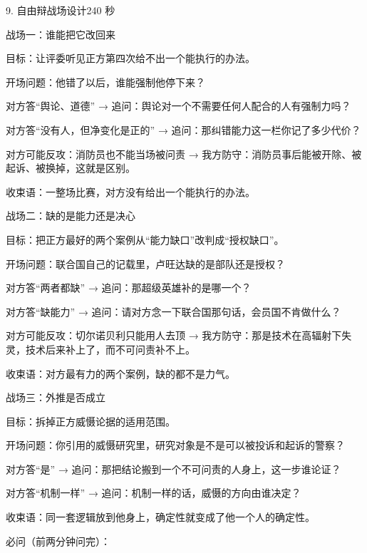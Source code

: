 \documentclass[script,con]{debate}
\begin{document}
\begin{stage}{9. 自由辩战场设计}{240 秒}
\begin{battleground}{战场一：谁能把它改回来}
\begin{bullets}
\item 目标：让评委听见正方第四次给不出一个能执行的办法。
\item 开场问题：他错了以后，谁能强制他停下来？
\item 对方答“舆论、道德” → 追问：舆论对一个不需要任何人配合的人有强制力吗？
\item 对方答“没有人，但净变化是正的” → 追问：那纠错能力这一栏你记了多少代价？
\item 对方可能反攻：消防员也不能当场被问责 → 我方防守：消防员事后能被开除、被起诉、被换掉，这就是区别。
\item 收束语：一整场比赛，对方没有给出一个能执行的办法。
\end{bullets}
\end{battleground}
\begin{battleground}{战场二：缺的是能力还是决心}
\begin{bullets}
\item 目标：把正方最好的两个案例从“能力缺口”改判成“授权缺口”。
\item 开场问题：联合国自己的记载里，卢旺达缺的是部队还是授权？
\item 对方答“两者都缺” → 追问：那超级英雄补的是哪一个？
\item 对方答“缺能力” → 追问：请对方念一下联合国那句话，会员国不肯做什么？
\item 对方可能反攻：切尔诺贝利只能用人去顶 → 我方防守：那是技术在高辐射下失灵，技术后来补上了，而不可问责补不上。
\item 收束语：对方最有力的两个案例，缺的都不是力气。
\end{bullets}
\end{battleground}
\begin{battleground}{战场三：外推是否成立}
\begin{bullets}
\item 目标：拆掉正方威慑论据的适用范围。
\item 开场问题：你引用的威慑研究里，研究对象是不是可以被投诉和起诉的警察？
\item 对方答“是” → 追问：那把结论搬到一个不可问责的人身上，这一步谁论证？
\item 对方答“机制一样” → 追问：机制一样的话，威慑的方向由谁决定？
\item 收束语：同一套逻辑放到他身上，确定性就变成了他一个人的确定性。
\end{bullets}
必问（前两分钟问完）：


\end{battleground}
\end{stage}
\end{document}
